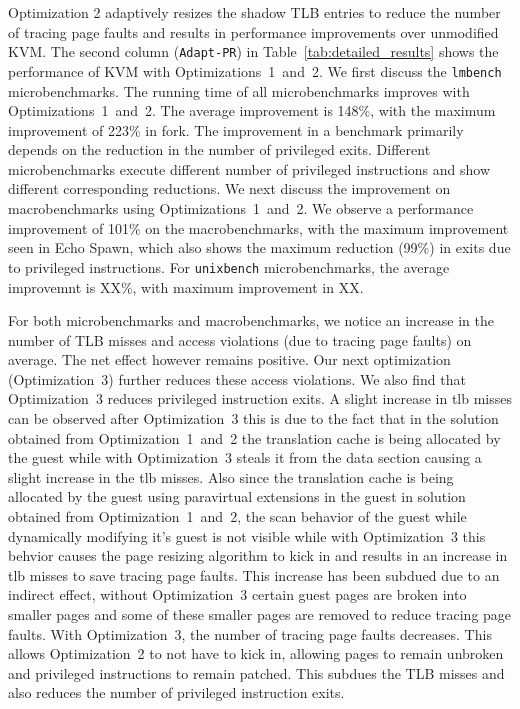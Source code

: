 Optimization 2 adaptively resizes the shadow TLB entries to reduce the number of tracing page faults and results in performance improvements over unmodified KVM. The second column ({\tt Adapt-PR}) in Table~\ref{tab:detailed_results} shows the performance of KVM with Optimizations~1~and~2. We first discuss the {\tt lmbench} microbenchmarks. The running time of all microbenchmarks improves with Optimizations~1~and~2. The average improvement is 148\%, with the maximum improvement of 223\% in fork. The improvement in a benchmark primarily depends on the reduction in the number of privileged exits. Different microbenchmarks execute different number of privileged instructions and show different corresponding reductions. We next discuss the improvement on macrobenchmarks using Optimizations~1~and~2. We observe a performance improvement of 101\% on the macrobenchmarks, with the maximum improvement seen in Echo Spawn, which also shows the maximum reduction (99\%) in exits due to privileged instructions. For {\tt unixbench} microbenchmarks, the average improvemnt is XX\%, with maximum improvement in XX. 

For both microbenchmarks and macrobenchmarks, we notice an increase in the number of TLB misses and access violations (due to tracing page faults) on average. The net effect however remains positive. Our next optimization (Optimization~3) further reduces these access violations. We also find that Optimization~3 reduces privileged instruction exits. A slight increase in tlb misses can be observed after Optimization~3 this is due to the fact that in the solution obtained from Optimization~1~and~2  the translation cache is being allocated by the guest while with Optimization~3 steals it from the data section causing a slight increase in the tlb misses. Also since the translation cache is being allocated by the guest using paravirtual extensions in the guest in solution obtained from Optimization~1~and~2, the scan behavior of the guest while dynamically modifying it's guest is not visible while with Optimization~3 this behvior causes the page resizing algorithm to kick in and results in an increase in tlb misses to save tracing page faults.
This increase has been subdued due to an indirect effect, without Optimization~3 certain guest pages are broken into smaller pages and some of these smaller pages are removed to reduce tracing page faults. With Optimization~3, the number of tracing page faults decreases. This allows Optimization~2 to not have to kick in, allowing pages to remain unbroken and privileged instructions to remain patched. This subdues the TLB misses and also reduces the number of privileged instruction exits. 


